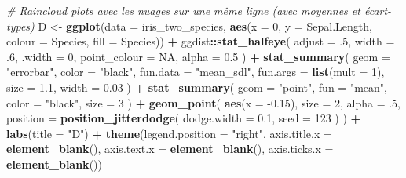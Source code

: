 \documentclass[
  french,
]{book}
\newenvironment{Shaded}{\begin{snugshade}}{\end{snugshade}}
\newcommand{\CommentTok}[1]{\textcolor[rgb]{0.56,0.35,0.01}{\textit{#1}}}
\newcommand{\DataTypeTok}[1]{\textcolor[rgb]{0.13,0.29,0.53}{#1}}
\newcommand{\DecValTok}[1]{\textcolor[rgb]{0.00,0.00,0.81}{#1}}
\newcommand{\FloatTok}[1]{\textcolor[rgb]{0.00,0.00,0.81}{#1}}
\newcommand{\KeywordTok}[1]{\textcolor[rgb]{0.13,0.29,0.53}{\textbf{#1}}}
\newcommand{\NormalTok}[1]{#1}
\newcommand{\OperatorTok}[1]{\textcolor[rgb]{0.81,0.36,0.00}{\textbf{#1}}}
\newcommand{\OtherTok}[1]{\textcolor[rgb]{0.56,0.35,0.01}{#1}}
\newcommand{\StringTok}[1]{\textcolor[rgb]{0.31,0.60,0.02}{#1}}
\begin{document}
\begin{Shaded}
\begin{Highlighting}[]
\CommentTok{# Raincloud plots avec les nuages sur une même ligne (avec moyennes et écart-types)}
\NormalTok{D <-}
\StringTok{  }\KeywordTok{ggplot}\NormalTok{(}\DataTypeTok{data =}\NormalTok{ iris_two_species, }
         \KeywordTok{aes}\NormalTok{(}\DataTypeTok{x =} \DecValTok{0}\NormalTok{, }\DataTypeTok{y =}\NormalTok{ Sepal.Length, }\DataTypeTok{colour =}\NormalTok{ Species, }\DataTypeTok{fill =}\NormalTok{ Species)) }\OperatorTok{+}
\StringTok{  }\NormalTok{ggdist}\OperatorTok{::}\KeywordTok{stat_halfeye}\NormalTok{(}
    \DataTypeTok{adjust =} \FloatTok{.5}\NormalTok{, }
    \DataTypeTok{width =} \FloatTok{.6}\NormalTok{, }
    \DataTypeTok{.width =} \DecValTok{0}\NormalTok{, }
    \DataTypeTok{point_colour =} \OtherTok{NA}\NormalTok{,}
    \DataTypeTok{alpha =} \FloatTok{0.5}
\NormalTok{    ) }\OperatorTok{+}
\StringTok{  }\KeywordTok{stat_summary}\NormalTok{(}
    \DataTypeTok{geom =} \StringTok{"errorbar"}\NormalTok{,}
    \DataTypeTok{color =} \StringTok{"black"}\NormalTok{,}
    \DataTypeTok{fun.data =} \StringTok{"mean_sdl"}\NormalTok{,}
    \DataTypeTok{fun.args =} \KeywordTok{list}\NormalTok{(}\DataTypeTok{mult =} \DecValTok{1}\NormalTok{),}
    \DataTypeTok{size =} \FloatTok{1.1}\NormalTok{, }
    \DataTypeTok{width =} \FloatTok{0.03}
\NormalTok{    ) }\OperatorTok{+}\StringTok{ }
\StringTok{  }\KeywordTok{stat_summary}\NormalTok{(}
    \DataTypeTok{geom =} \StringTok{"point"}\NormalTok{,}
    \DataTypeTok{fun =} \StringTok{"mean"}\NormalTok{, }
    \DataTypeTok{color =} \StringTok{"black"}\NormalTok{,}
    \DataTypeTok{size =} \DecValTok{3}
\NormalTok{    ) }\OperatorTok{+}
\StringTok{  }\KeywordTok{geom_point}\NormalTok{(}
    \KeywordTok{aes}\NormalTok{(}\DataTypeTok{x =} \FloatTok{-0.15}\NormalTok{),}
    \DataTypeTok{size =} \DecValTok{2}\NormalTok{, }
    \DataTypeTok{alpha =} \FloatTok{.5}\NormalTok{,}
    \DataTypeTok{position =} \KeywordTok{position_jitterdodge}\NormalTok{(}
                          \DataTypeTok{dodge.width =} \FloatTok{0.1}\NormalTok{,}
                          \DataTypeTok{seed =} \DecValTok{123}
\NormalTok{                    )}
\NormalTok{  ) }\OperatorTok{+}
\StringTok{  }\KeywordTok{labs}\NormalTok{(}\DataTypeTok{title =} \StringTok{"D"}\NormalTok{) }\OperatorTok{+}
\StringTok{  }\KeywordTok{theme}\NormalTok{(}\DataTypeTok{legend.position =} \StringTok{"right"}\NormalTok{,}
        \DataTypeTok{axis.title.x =} \KeywordTok{element_blank}\NormalTok{(),}
        \DataTypeTok{axis.text.x =} \KeywordTok{element_blank}\NormalTok{(),}
        \DataTypeTok{axis.ticks.x =} \KeywordTok{element_blank}\NormalTok{())}
\end{Highlighting}
\end{Shaded}
\end{document}
